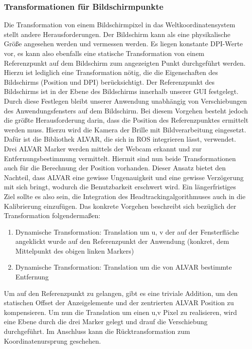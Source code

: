 \subsubsection*{Transformationen für Bildschirmpunkte}
\label{ssection:alva}
Die Transformation von einem Bildschirmpixel in das Weltkoordinatensystem stellt andere Herausforderungen. 
Der Bildschirm kann als eine physikalische Größe angesehen werden und vermessen werden. 
Es liegen konstante  \ac{DPI}-Werte vor, es kann also ebenfalls eine statische Transformation von einem Referenzpunkt auf dem Bildschirm zum angezeigten Punkt durchgeführt werden. 
Hierzu ist lediglich eine Transformation nötig, die die Eigenschaften des Bildschirms (Position und DPI) berücksichtigt. 
Der Referenzpunkt des Bildschirms ist in der Ebene des Bildschirms innerhalb unserer GUI festgelegt. Durch diese Festlegen bleibt unserer Anwendung unabhängig von Verschiebungen des Anwendungsfensters auf dem Bildschirm. 
Bei diesem Vorgehen besteht jedoch die größte Herausforderung darin, dass die Position des Referenzpunktes ermittelt werden muss. 
Hierzu wird die Kamera der Brille mit Bildverarbeitung eingesetzt. 
Dafür ist die Bibliothek ALVAR, die sich in ROS integrieren lässt, verwendet.
Drei ALVAR Marker werden mittels der Webcam erkannt und zur Entfernungsbestimmung vermittelt. 
Hiermit sind nun beide Transformationen auch für die Berechnung der Position vorhanden. 
Dieser Ansatz bietet den Nachteil, dass ALVAR eine gewisse Ungenauigkeit und eine gewisse Verzögerung mit sich bringt, wodurch die Benutzbarkeit erschwert wird. 
Ein längerfristiges Ziel sollte es also sein, die Integration des Headtrackingalgorithmuses auch in die Kalibrierung einzufügen.
Das konkrete Vorgehen beschreibt sich bezüglich der Transformation folgendermaßen:

   \begin{enumerate}
      \item Dynamische Transformation:  Translation  um u, v der auf der Fensterfläche angeklickt wurde auf den Referenzpunkt der Anwendung (konkret, dem Mittelpunkt des obigen linken Markers) 
      \item Dynamische Transformation: Translation um die von ALVAR bestimmte Entfernung
   \end{enumerate}

Um auf den Referenzpunkt zu gelangen, gibt es eine triviale Addition, um den statischen Offset der Anzeigelemente und der zentrierten ALVAR Position zu kompensieren. 
Um nun die Translation um einen u,v Pixel zu realisieren, wird eine Ebene durch die drei Marker gelegt und drauf die Verschiebung durchgeführt. 
Im Anschluss kann die Rücktransformation zum Koordinatenursprung geschehen.


